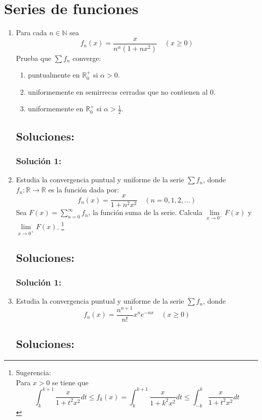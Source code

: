 \documentclass[a4paper, 11pt]{article} %
\begin{document}
\section*{Series de funciones}
\begin{enumerate}
	\item Para cada $n \in \mathbb{N}$ sea
	$$f_n(x) = \frac{x}{n^\alpha (1+nx^2)} \quad (x \geq 0)$$
	Prueba que $\sum f_n$ converge:
	\begin{enumerate}
		\item puntualmente en $\mathbb{R}^+_0$ si $\alpha > 0$.
		\item uniformemente en semirrecas cerradas que no contienen al 0.
		\item uniformemente en $\mathbb{R}^+_0$ si $\alpha > \frac{1}{2}$.
	\end{enumerate}
	\subsection*{Soluciones:}
		\subsubsection*{Solución 1:}
	
	\item Estudia la convergencia puntual y uniforme de la serie $\sum f_n$, donde $f_n: \mathbb{R}
	\rightarrow \mathbb{R}$ es la función dada por:
	$$f_n(x) = \frac{x}{1+n^2x^2} \quad (n = 0, 1, 2, \dots)$$
	Sea $F(x)= \displaystyle{\sum^{\infty}_{n = 0} f_n}$, la función suma de la serie. Calcula
	$\lim\limits_{x \rightarrow 0^-} F(x)$ y $\lim\limits_{x \rightarrow 0^+} F(x)$. \footnote{Sugerencia:\\
	Para $x > 0$ se tiene que
	$$\int^{k+1}_{k} \frac{x}{1+t^2x^2} dt \leq f_k(x) = \int^{k+1}_{k} \frac{x}{1+k^2x^2} dt \leq
	\int^{k}_{-k} \frac{x}{1+t^2x^2} dt$$}
	\subsection*{Soluciones:}
		\subsubsection*{Solución 1:}
	
	\item Estudia la convergencia puntual y uniforme de la serie $\sum f_n$, donde
	$$f_n(x)=\frac{n^{n+1}}{n!} x^n e^{-nx} \quad (x \geq 0)$$
	\subsection*{Soluciones:}

\end{enumerate}
\end{document}
